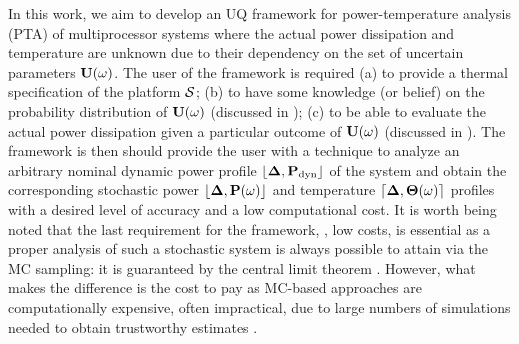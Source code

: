 In this work, we aim to develop an UQ framework for power-temperature analysis (PTA) of multiprocessor systems where the actual power dissipation and temperature are unknown due to their dependency on the set of uncertain parameters $\mathbf{U}(\omega)$. The user of the framework is required (a) to provide a thermal specification of the platform $\mathcal{S}$; (b) to have some knowledge (or belief) on the probability distribution of $\mathbf{U}(\omega)$ (discussed in ); (c) to be able to evaluate the actual power dissipation given a particular outcome of $\mathbf{U}(\omega)$ (discussed in ). The framework is then should provide the user with a technique to analyze an arbitrary nominal dynamic power profile $\profPdyn$ of the system and obtain the corresponding stochastic power $\profP{\o}$ and temperature $\profT{\o}$ profiles with a desired level of accuracy and a low computational cost. It is worth being noted that the last requirement for the framework, \ie, low costs, is essential as a proper analysis of such a stochastic system is always possible to attain via the MC sampling: it is guaranteed by the central limit theorem \cite{durrett2010}. However, what makes the difference is the cost to pay as MC-based approaches are computationally expensive, often impractical, due to large numbers of simulations needed to obtain trustworthy estimates \cite{xiu2010, maitre2010, diaz-emparanza2002}.
